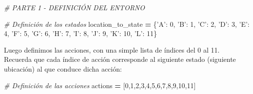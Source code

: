 \documentclass[]{book}
\newenvironment{Shaded}{\begin{snugshade}}{\end{snugshade}}
\newcommand{\CommentTok}[1]{\textcolor[rgb]{0.56,0.35,0.01}{\textit{#1}}}
\newcommand{\DecValTok}[1]{\textcolor[rgb]{0.00,0.00,0.81}{#1}}
\newcommand{\NormalTok}[1]{#1}
\newcommand{\OperatorTok}[1]{\textcolor[rgb]{0.81,0.36,0.00}{\textbf{#1}}}
\newcommand{\StringTok}[1]{\textcolor[rgb]{0.31,0.60,0.02}{#1}}
\begin{document}
\begin{Shaded}
\begin{Highlighting}[]
\CommentTok{# PARTE 1 - DEFINICIÓN DEL ENTORNO}

\CommentTok{# Definición de los estados}
\NormalTok{location_to_state }\OperatorTok{=}\NormalTok{ \{}\StringTok{'A'}\NormalTok{: }\DecValTok{0}\NormalTok{,}
                     \StringTok{'B'}\NormalTok{: }\DecValTok{1}\NormalTok{,}
                     \StringTok{'C'}\NormalTok{: }\DecValTok{2}\NormalTok{,}
                     \StringTok{'D'}\NormalTok{: }\DecValTok{3}\NormalTok{,}
                     \StringTok{'E'}\NormalTok{: }\DecValTok{4}\NormalTok{,}
                     \StringTok{'F'}\NormalTok{: }\DecValTok{5}\NormalTok{,}
                     \StringTok{'G'}\NormalTok{: }\DecValTok{6}\NormalTok{,}
                     \StringTok{'H'}\NormalTok{: }\DecValTok{7}\NormalTok{,}
                     \StringTok{'I'}\NormalTok{: }\DecValTok{8}\NormalTok{,}
                     \StringTok{'J'}\NormalTok{: }\DecValTok{9}\NormalTok{,}
                     \StringTok{'K'}\NormalTok{: }\DecValTok{10}\NormalTok{,}
                     \StringTok{'L'}\NormalTok{: }\DecValTok{11}\NormalTok{\}}
\end{Highlighting}
\end{Shaded}

Luego definimos las acciones, con una simple lista de índices del 0 al 11. Recuerda que cada índice de acción corresponde al siguiente estado (siguiente ubicación) al que conduce dicha acción:

\begin{Shaded}
\begin{Highlighting}[]
\CommentTok{# Definición de las acciones}
\NormalTok{actions }\OperatorTok{=}\NormalTok{ [}\DecValTok{0}\NormalTok{,}\DecValTok{1}\NormalTok{,}\DecValTok{2}\NormalTok{,}\DecValTok{3}\NormalTok{,}\DecValTok{4}\NormalTok{,}\DecValTok{5}\NormalTok{,}\DecValTok{6}\NormalTok{,}\DecValTok{7}\NormalTok{,}\DecValTok{8}\NormalTok{,}\DecValTok{9}\NormalTok{,}\DecValTok{10}\NormalTok{,}\DecValTok{11}\NormalTok{]}
\end{Highlighting}
\end{Shaded}
\end{document}
